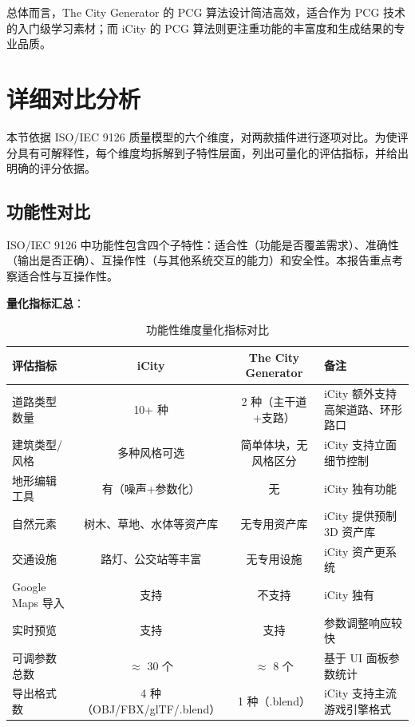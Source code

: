 \documentclass[UTF8,a4paper,10pt]{ctexart}
\begin{document}
总体而言，The City Generator 的 PCG 算法设计简洁高效，适合作为 PCG 技术的入门级学习素材；而 iCity 的 PCG 算法则更注重功能的丰富度和生成结果的专业品质。

\section{详细对比分析}

本节依据 ISO/IEC 9126 质量模型的六个维度，对两款插件进行逐项对比。为使评分具有可解释性，每个维度均拆解到子特性层面，列出可量化的评估指标，并给出明确的评分依据。

\subsection{功能性对比}

ISO/IEC 9126 中功能性包含四个子特性：适合性（功能是否覆盖需求）、准确性（输出是否正确）、互操作性（与其他系统交互的能力）和安全性。本报告重点考察适合性与互操作性。

\textbf{量化指标汇总}：

\begin{table}[htbp]
\centering
\caption{功能性维度量化指标对比}
\label{tab:functionality_quant}
\begin{tabular}{p{2.5cm}ccX}
\toprule
\textbf{评估指标} & \textbf{iCity} & \textbf{The City Generator} & \textbf{备注} \\
\midrule
道路类型数量 & 10+ 种 & 2 种（主干道+支路） & iCity 额外支持高架道路、环形路口 \\
建筑类型/风格 & 多种风格可选 & 简单体块，无风格区分 & iCity 支持立面细节控制 \\
地形编辑工具 & 有（噪声+参数化） & 无 & iCity 独有功能 \\
自然元素 & 树木、草地、水体等资产库 & 无专用资产库 & iCity 提供预制 3D 资产库 \\
交通设施 & 路灯、公交站等丰富 & 无专用设施 & iCity 资产更系统 \\
Google Maps 导入 & 支持 & 不支持 & iCity 独有 \\
实时预览 & 支持 & 支持 & 参数调整响应较快 \\
可调参数总数 & $\approx$ 30 个 & $\approx$ 8 个 & 基于 UI 面板参数统计 \\
导出格式数 & 4 种（OBJ/FBX/glTF/.blend） & 1 种（.blend） & iCity 支持主流游戏引擎格式 \\
\bottomrule
\end{tabular}
\end{table}
\end{document}
